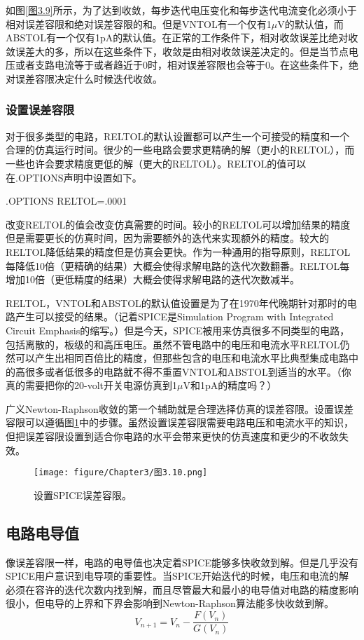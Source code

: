 如图\ref{图3.9}所示，为了达到收敛，每步迭代电压变化和每步迭代电流变化必须小于相对误差容限和绝对误差容限的和。但是VNTOL有一个仅有1$\mu$V的默认值，而ABSTOL有一个仅有1pA的默认值。在正常的工作条件下，相对收敛误差比绝对收敛误差大的多，所以在这些条件下，收敛是由相对收敛误差决定的。但是当节点电压或者支路电流等于或者趋近于0时，相对误差容限也会等于0。在这些条件下，绝对误差容限决定什么时候迭代收敛。

\subsubsection{设置误差容限}
对于很多类型的电路，RELTOL的默认设置都可以产生一个可接受的精度和一个合理的仿真运行时间。很少的一些电路会要求更精确的解（更小的RELTOL），而一些也许会要求精度更低的解（更大的RELTOL）。RELTOL的值可以在.OPTIONS声明中设置如下。

.OPTIONS RELTOL=.0001

改变RELTOL的值会改变仿真需要的时间。较小的RELTOL可以增加结果的精度但是需要更长的仿真时间，因为需要额外的迭代来实现额外的精度。较大的RELTOL降低结果的精度但是仿真会更快。作为一种通用的指导原则，RELTOL每降低10倍（更精确的结果）大概会使得求解电路的迭代次数翻番。RELTOL每增加10倍（更低精度的结果）大概会使得求解电路的迭代次数减半。

RELTOL，VNTOL和ABSTOL的默认值设置是为了在1970年代晚期针对那时的电路产生可以接受的结果。（记着SPICE是Simulation Program with Integrated Circuit Emphasis的缩写。）但是今天，SPICE被用来仿真很多不同类型的电路，包括离散的，板级的和高压电压。虽然不管电路中的电压和电流水平RELTOL仍然可以产生出相同百倍比的精度，但那些包含的电压和电流水平比典型集成电路中的高很多或者低很多的电路就不得不重置VNTOL和ABSTOL到适当的水平。（你真的需要把你的20-volt开关电源仿真到1$\mu$V和1pA的精度吗？）

广义Newton-Raphson收敛的第一个辅助就是合理选择仿真的误差容限。设置误差容限可以遵循图\ref{图3.10}中的步骤。虽然设置误差容限需要电路电压和电流水平的知识，但把误差容限设置到适合你电路的水平会带来更快的仿真速度和更少的不收敛失效。
\begin{figure}[htbp]
\small
    \centering
    \texttt{[image: figure/Chapter3/图3.10.png]}
    \caption{设置SPICE误差容限。}
    \label{图3.10}
\end{figure}

\subsection{电路电导值}
像误差容限一样，电路的电导值也决定着SPICE能够多快收敛到解。但是几乎没有SPICE用户意识到电导项的重要性。当SPICE开始迭代的时候，电压和电流的解必须在容许的迭代次数内找到解，而且尽管最大和最小的电导值对电路的精度影响很小，但电导的上界和下界会影响到Newton-Raphson算法能多快收敛到解。
\begin{equation}
    V_{n+1}=V_n - \frac{F(V_n)}{G(V_n)}
    \label{eq:3.1}
\end{equation}

